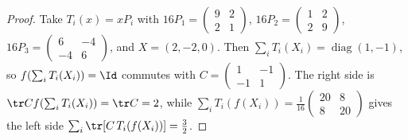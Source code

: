 \begin{proof}\leanok
    Take $T_i(x)=xP_i$ with
    $16P_1=\left(\begin{smallmatrix}9&2\\2&1\end{smallmatrix}\right)$,
    $16P_2=\left(\begin{smallmatrix}1&2\\2&9\end{smallmatrix}\right)$,
    $16P_3=\left(\begin{smallmatrix}6&-4\\-4&6\end{smallmatrix}\right)$,
    and $X=(2,-2,0)$. Then $\sum_iT_i(X_i)=\operatorname{diag}(1,-1)$, so
    $f(\sum_iT_i(X_i))=\Id$ commutes with
    $C=\left(\begin{smallmatrix}1&-1\\-1&1\end{smallmatrix}\right)$. The right
    side is $\tr Cf(\sum_iT_i(X_i))=\tr C=2$, while
    $\sum_iT_i(f(X_i))=\frac1{16}\left(\begin{smallmatrix}20&8\\8&20\end{smallmatrix}\right)$
    gives the left side $\sum_i\tr[C\,T_i(f(X_i))]=\frac32$.
\end{proof}
